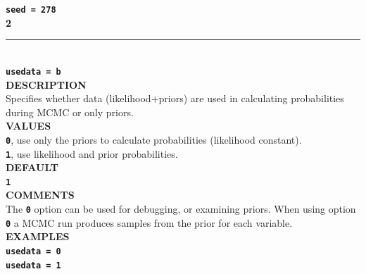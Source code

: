 \documentclass[a4paper]{book}
\numberwithin{equation}{section} \renewcommand{\baselinestretch}{0.55}
\begin{document}
\textbf{\texttt{seed = 278}}\vspace{10pt}\\
\textbf{{\large 2}} \\
\noindent\rule{\textwidth}{0.8pt} \\
\textbf{{\Large \texttt{usedata = b}}} \vspace{5pt}\\
\textbf{DESCRIPTION} \vspace{5pt}\\
Specifies whether data (likelihood+priors) are used in calculating probabilities during MCMC or only priors.\vspace{5pt}\\
\textbf{VALUES} \vspace{5pt}\\
\textbf{\texttt{0}}, use only the priors to calculate probabilities (likelihood constant).\vspace{5pt}\\
\textbf{\texttt{1}}, use likelihood and prior probabilities. \vspace{5pt}\\
\textbf{DEFAULT}\vspace{5pt}\\
\textbf{\texttt{1}} \vspace{5pt}\\
\textbf{COMMENTS} \vspace{5pt}\\
The \textbf{\texttt{0}} option can be used for debugging, or examining priors. When using option \textbf{\texttt{0}} a MCMC run produces samples from the prior for each variable. \vspace{5pt}\\
\textbf{EXAMPLES} \vspace{5pt}\\
\textbf{\texttt{usedata = 0}} \vspace{5pt}\\
\textbf{\texttt{usedata = 1}} \vspace{10pt}\\
\end{document}
